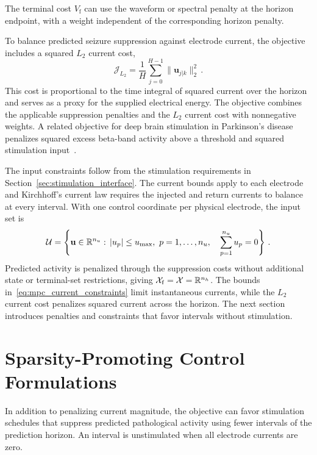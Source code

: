 The terminal cost $V_{\mathrm f}$ can use the waveform or spectral penalty at the horizon endpoint, with a weight independent of the corresponding horizon penalty.

To balance predicted seizure suppression against electrode current, the objective includes a squared $L_2$ current cost,
%
\begin{equation*}
    \mathcal J_{L_2}
    =\frac{1}{H}\sum_{j=0}^{H-1}
      \|\mathbf u_{j|k}\|_2^2\,.
\end{equation*}
%
This cost is proportional to the time integral of squared current over the horizon and serves as a proxy for the supplied electrical energy.
The objective combines the applicable suppression penalties and the $L_2$ current cost with nonnegative weights.
A related objective for deep brain stimulation in Parkinson's disease penalizes squared excess beta-band activity above a threshold and squared stimulation input~\cite{Steffen2025}.

The input constraints follow from the stimulation requirements in Section~\ref{sec:stimulation_interface}.
The current bounds apply to each electrode and Kirchhoff's current law requires the injected and return currents to balance at every interval.
With one control coordinate per physical electrode, the input set is
%
\begin{equation}
    \mathcal U
    =\left\{\mathbf u\in\mathbb R^{\ndim{u}}:\,
        |u_p|\leq u_\mathrm{max},\ p=1,\ldots,\ndim{u},\quad %
        \sum_{p=1}^{\ndim{u}}u_p=0
      \right\}\,.    \label{eq:mpc_current_constraints}
\end{equation}
%
Predicted activity is penalized through the suppression costs without additional state or terminal-set restrictions, giving $\mathcal X_{\mathrm f}=\mathcal X=\mathbb R^{n_{h}}$.
The bounds in~\eqref{eq:mpc_current_constraints} limit instantaneous currents, while the $L_2$ current cost penalizes squared current across the horizon.
The next section introduces penalties and constraints that favor intervals without stimulation.

\section{Sparsity-Promoting Control Formulations}\label{sec:mpc_sparse_formulations}

In addition to penalizing current magnitude, the objective can favor stimulation schedules that suppress predicted pathological activity using fewer intervals of the prediction horizon.
An interval is unstimulated when all electrode currents are zero.

